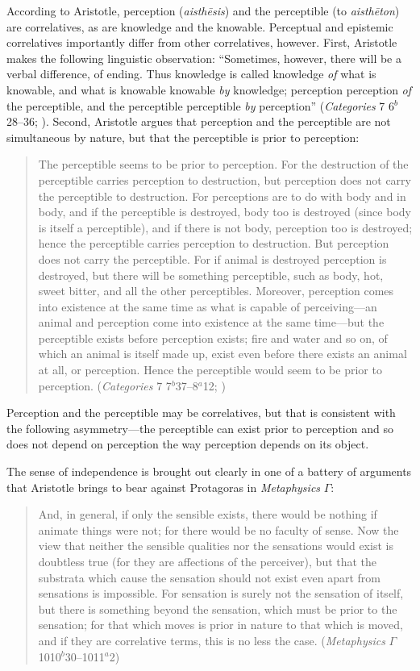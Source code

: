 According to Aristotle, perception (\emph{aisthēsis}) and the perceptible (to \emph{aisthēton}) are correlatives, as are knowledge and the knowable. Perceptual and epistemic correlatives importantly differ from other correlatives, however. First, Aristotle makes the following linguistic observation: ``Sometimes, however, there will be a verbal difference, of ending. Thus knowledge is called knowledge \emph{of} what is knowable, and what is knowable knowable \emph{by} knowledge; perception perception \emph{of} the perceptible, and the perceptible perceptible \emph{by} perception'' (\emph{Categories} 7 6\( ^{b} \)28--36; \citealt{Ackrill:1963fk}). Second, Aristotle argues that perception and the perceptible are not simultaneous by nature, but that the perceptible is prior to perception:
\begin{quote}
    The perceptible seems to be prior to perception. For the destruction of the perceptible carries perception to destruction, but perception does not carry the perceptible to destruction. For perceptions are to do with body and in body, and if the perceptible is destroyed, body too is destroyed (since body is itself a perceptible), and if there is not body, perception too is destroyed; hence the perceptible carries perception to destruction. But perception does not carry the perceptible. For if animal is destroyed perception is destroyed, but there will be something perceptible, such as body, hot, sweet bitter, and all the other perceptibles. Moreover, perception comes into existence at the same time as what is capable of perceiving---an animal and perception come into existence at the same time---but the perceptible exists before perception exists; fire and water and so on, of which an animal is itself made up, exist even before there exists an animal at all, or perception. Hence the perceptible would seem to be prior to perception. (\emph{Categories} 7 7\( ^{b} \)37--8\( ^{a} \)12; \citealt{Ackrill:1963fk})
\end{quote}
Perception and the perceptible may be correlatives, but that is consistent with the following asymmetry---the perceptible can exist prior to perception and so does not depend on perception the way perception depends on its object.

The sense of independence is brought out clearly in one of a battery of arguments that Aristotle brings to bear against Protagoras in \emph{Metaphysics} \( \Gamma \):
\begin{quote}
	And, in general, if only the sensible exists, there would be nothing if animate things were not; for there would be no faculty of sense. Now the view that neither the sensible qualities nor the sensations would exist is doubtless true (for they are affections of the perceiver), but that the substrata which cause the sensation should not exist even apart from sensations is impossible. For sensation is surely not the sensation of itself, but there is something beyond the sensation, which must be prior to the sensation; for that which moves is prior in nature to that which is moved, and if they are correlative terms, this is no less the case. (\emph{Metaphysics} \( \Gamma \) 1010\( ^{b} \)30--1011\( ^{a} \)2)
\end{quote}


